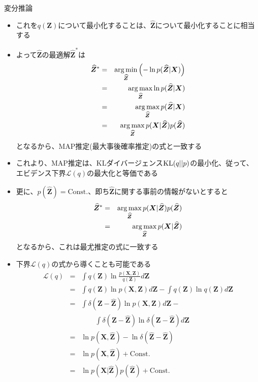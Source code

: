 \documentclass[dvipdfmx,notheorems,t]{beamer}
\begin{document}
\begin{frame}{変分推論}
\begin{itemize}
\begin{itemize}
		\item これを$q(\bm{Z})$について最小化することは、$\widehat{\bm{Z}}$について最小化することに相当する
		\item よって$\widehat{\bm{Z}}$の最適解$\widehat{\bm{Z}}^*$は
		\begin{eqnarray}
			\widehat{\bm{Z}}^* &=& \operatorname*{arg\,min}_{\widehat{\bm{Z}}} \left( -\ln p(\widehat{\bm{Z}} | \bm{X}) \right) \\
			&=& \operatorname*{arg\,max}_{\widehat{\bm{Z}}} \ln p(\widehat{\bm{Z}} | \bm{X}) \\
			&=& \operatorname*{arg\,max}_{\widehat{\bm{Z}}} p(\widehat{\bm{Z}} | \bm{X}) \\
			&=& \operatorname*{arg\,max}_{\widehat{\bm{Z}}} p(\bm{X} | \widehat{\bm{Z}}) p(\widehat{\bm{Z}})
		\end{eqnarray}
		となるから、\alert{MAP推定}(\alert{最大事後確率}推定)の式と一致する
		\newline
		
		\item これより、MAP推定は、KLダイバージェンス$\operatorname{KL}(q || p)$の最小化、従って、\color{red}エビデンス下界$\mathcal{L}(q)$の最大化と等価\normalcolor である
		\newline
		\item 更に、$p(\widehat{\bm{Z}}) = \mathrm{Const.}$、即ち$\widehat{\bm{Z}}$に関する事前の情報がないとすると
		\begin{eqnarray}
			\widehat{\bm{Z}}^* &=& \operatorname*{arg\,max}_{\widehat{\bm{Z}}} p(\bm{X} | \widehat{\bm{Z}}) p(\widehat{\bm{Z}}) \nonumber \\
			&=& \operatorname*{arg\,max}_{\widehat{\bm{Z}}} p(\bm{X} | \widehat{\bm{Z}})
		\end{eqnarray}
		となるから、これは\alert{最尤推定}の式に一致する
		\newline
		
		\item 下界$\mathcal{L}(q)$の式から導くことも可能である
		\begin{eqnarray}
			\mathcal{L}(q) &=& \int q(\bm{Z}) \ln \frac{p(\bm{X}, \bm{Z})}{q(\bm{Z})} d\bm{Z} \nonumber \\
			&=& \int q(\bm{Z}) \ln p(\bm{X}, \bm{Z}) d\bm{Z} - \int q(\bm{Z}) \ln q(\bm{Z}) d\bm{Z} \\
			&=& \int \delta(\bm{Z} - \widehat{\bm{Z}}) \ln p(\bm{X}, \bm{Z}) d\bm{Z} - \nonumber \\
			&& \qquad \int \delta(\bm{Z} - \widehat{\bm{Z}}) \ln \delta(\bm{Z} - \widehat{\bm{Z}}) d\bm{Z} \\
			&=& \ln p(\bm{X}, \widehat{\bm{Z}}) - \ln \delta(\widehat{\bm{Z}} - \widehat{\bm{Z}}) \\
			&=& \ln p(\bm{X}, \widehat{\bm{Z}}) + \mathrm{Const.} \\
			&=& \ln p(\bm{X} | \widehat{\bm{Z}}) p(\widehat{\bm{Z}}) + \mathrm{Const.}
		\end{eqnarray}
		

\end{itemize}
\end{itemize}
\end{frame}
\end{document}
